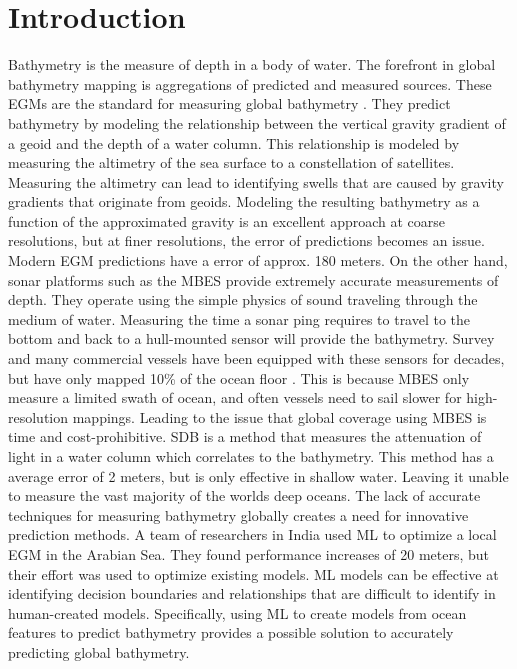 
\section{Introduction}
\setlength{\parindent}{10ex}
Bathymetry is the measure of depth in a body of water.
The forefront in global bathymetry mapping is aggregations of predicted and measured sources. 
These \ac{EGM}s are the standard for measuring global bathymetry \cite{becker2009global}\cite{smith1994bathymetric}\cite{smith1997global}\cite{smith2010planning}.
They predict bathymetry by modeling the relationship between the vertical gravity gradient of a geoid and the depth of a water column.
This relationship is modeled by measuring the altimetry of the sea surface to a constellation of satellites.
Measuring the altimetry can lead to identifying swells that are caused by gravity gradients that originate from geoids.
Modeling the resulting bathymetry as a function of the approximated gravity is an excellent approach at coarse resolutions, but at finer resolutions, the error of predictions becomes an issue.
Modern \ac{EGM} predictions have a error of approx. 180 meters.
On the other hand, sonar platforms such as the \ac{MBES} \cite{farr1980multibeam} provide extremely accurate measurements of depth. 
They operate using the simple physics of sound traveling through the medium of water.
Measuring the time a sonar ping requires to travel to the bottom and back to a hull-mounted sensor will provide the bathymetry.
Survey and many commercial vessels have been equipped with these sensors for decades, but have only mapped 10\% of the ocean floor \cite{becker2009global}.
This is because \ac{MBES} only measure a limited swath of ocean, and often vessels need to sail slower for high-resolution mappings.
Leading to the issue that global coverage using \ac{MBES} is time and cost-prohibitive.
\ac{SDB} is a method that measures the attenuation of light in a water column which correlates to the bathymetry.
This method has a average error of 2 meters, but is only effective in shallow water.
Leaving it unable to measure the vast majority of the worlds deep oceans.
The lack of accurate techniques for measuring bathymetry globally creates a need for innovative prediction methods.
A team of researchers in India \cite{jena2012prediction} used \ac{ML} to optimize a local \ac{EGM} in the Arabian Sea.
They found performance increases of 20 meters, but their effort was used to optimize existing models.
\ac{ML} models can be effective at identifying decision boundaries and relationships that are difficult to identify in human-created models.
Specifically, using \ac{ML} to create models from ocean features to predict bathymetry provides a possible solution to accurately predicting global bathymetry.

